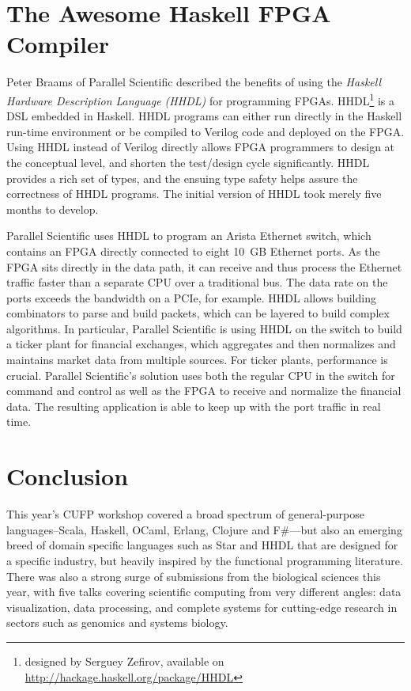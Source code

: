 \documentclass{jfp1}
\begin{document}
\section{The Awesome Haskell FPGA Compiler}

Peter Braams of Parallel Scientific described the benefits of using
the \textit{Haskell Hardware Description Language (HHDL)} for
programming FPGAs.  HHDL\footnote{designed by Serguey Zefirov,
  available on \url{http://hackage.haskell.org/package/HHDL}} is a DSL
embedded in Haskell.  HHDL programs can either run directly in the Haskell
run-time environment or be compiled to Verilog code and deployed on
the FPGA.  Using HHDL instead of Verilog directly allows FPGA
programmers to design at the conceptual level, and shorten the
test/design cycle significantly.  HHDL provides a rich set of types,
and the ensuing type safety helps assure the correctness of HHDL
programs.  The initial version of HHDL took merely five months to
develop.

Parallel Scientific uses HHDL to program an Arista Ethernet switch,
which contains an FPGA directly connected to eight 10~GB Ethernet
ports.  As the FPGA sits directly in the data path, it can receive and
thus process the Ethernet traffic faster than a separate CPU over a
traditional bus.  The data rate on the ports exceeds the bandwidth on
a PCIe, for example.  HHDL allows building combinators to parse and
build packets, which can be layered to build complex algorithms.  In
particular, Parallel Scientific is using HHDL on the switch to build a
ticker plant for financial exchanges, which aggregates and then
normalizes and maintains market data from multiple sources.  For
ticker plants, performance is crucial.  Parallel Scientific's solution
uses both the regular CPU in the switch for command and control as
well as the FPGA to receive and normalize the financial data.  The
resulting application is able to keep up with the port traffic in real
time.

\section{Conclusion}

This year's CUFP workshop covered a broad spectrum of general-purpose 
languages--Scala, Haskell, OCaml, Erlang, Clojure and F\#---but also
an emerging breed of domain specific languages such as Star and HHDL
that are designed for a specific industry, but heavily inspired by
the functional programming literature.  There was also a strong surge
of submissions from the biological sciences this year, with five
talks covering scientific computing from very different angles: data
visualization, data processing, and complete systems for cutting-edge
research in sectors such as genomics and systems biology.
\end{document}
